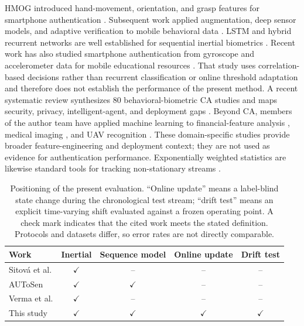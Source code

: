 \documentclass[3p,times,procedia]{elsarticle}
\begin{document}
HMOG introduced hand-movement, orientation, and grasp features for smartphone
authentication \cite{sitova_hmog_2016}. Subsequent work applied augmentation,
deep sensor models, and adaptive verification to mobile behavioral data
\cite{verma_data-driven_2022,li_using_2019,abuhamad_autosen_2020}. LSTM and
hybrid recurrent networks are well established for sequential inertial
biometrics \cite{hochreiter_long_1997,zeng_gait-based_2021,giorgi_using_2021}.
Recent work has also studied smartphone authentication from gyroscope and
accelerometer data for mobile educational resources
\cite{serbin_behavioral_2026}. That study uses correlation-based decisions
rather than recurrent classification or online threshold adaptation and
therefore does not establish the performance of the present method.
A recent systematic review synthesizes 80 behavioral-biometric CA studies and
maps security, privacy, intelligent-agent, and deployment gaps
\cite{gali_behavioral_2026}.
Beyond CA, members of the author team have applied machine learning to
financial-feature analysis \cite{rakhmetulayeva_identifying_2025,
bolshibayeva_diskbased_2025,kulbayeva_data_processing_2024}, medical imaging
\cite{tyunina_cataracts_2026}, and UAV recognition \cite{semenyuk_uav_2024}.
These domain-specific studies
provide broader feature-engineering and deployment context; they are not used
as evidence for authentication performance.
Exponentially weighted statistics are likewise standard tools for tracking
non-stationary streams \cite{ross_exponentially_2012,gama_survey_2014}.

\begin{table}[H]
\centering
\small
\caption{Positioning of the present evaluation. ``Online update'' means a
label-blind state change during the chronological test stream; ``drift test''
means an explicit time-varying shift evaluated against a frozen operating point.
A check mark indicates that the cited work meets the stated definition.
Protocols and datasets differ, so error rates are not directly comparable.}
\label{tab:position}
\begin{tabular}{lcccc}
\toprule
Work & Inertial & Sequence model & Online update & Drift test \\
\midrule
Sitov\'{a} et al. \cite{sitova_hmog_2016} & $\checkmark$ & -- & -- & -- \\
AUToSen \cite{abuhamad_autosen_2020} & $\checkmark$ & $\checkmark$ & -- & -- \\
Verma et al. \cite{verma_data-driven_2022} & $\checkmark$ & -- & -- & -- \\
This study & $\checkmark$ & $\checkmark$ & $\checkmark$ & $\checkmark$ \\
\bottomrule
\end{tabular}
\end{table}
\end{document}
